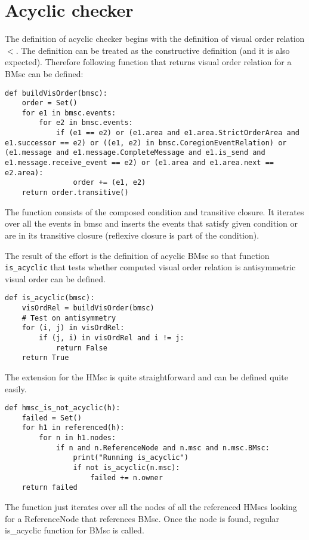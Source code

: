 \documentclass[11pt,oneside]{fithesis2}
\newcommand{\T}[1]{\texttt{#1}}
\begin{document}
\section{Acyclic checker}
The definition of acyclic checker begins with the definition of visual order relation $<$. The definition can be treated as the constructive definition (and it is also expected). Therefore following function that returns visual order relation for a BMsc can be defined:
\begin{lstlisting}
def buildVisOrder(bmsc):
    order = Set()
    for e1 in bmsc.events:
        for e2 in bmsc.events:
            if (e1 == e2) or (e1.area and e1.area.StrictOrderArea and e1.successor == e2) or ((e1, e2) in bmsc.CoregionEventRelation) or (e1.message and e1.message.CompleteMessage and e1.is_send and e1.message.receive_event == e2) or (e1.area and e1.area.next == e2.area):
                order += (e1, e2)
    return order.transitive()
\end{lstlisting}
The function consists of the composed condition and transitive closure. It iterates over all the events in bmsc and inserts the events that satisfy given condition or are in its transitive closure (reflexive closure is part of the condition).

The result of the effort is the definition of acyclic BMsc so that function \T{is\_acyclic} that tests whether computed visual order relation is antisymmetric visual order can be defined. 
\begin{lstlisting}
def is_acyclic(bmsc):
    visOrdRel = buildVisOrder(bmsc)
    # Test on antisymmetry
    for (i, j) in visOrdRel:
        if (j, i) in visOrdRel and i != j:
            return False
    return True
\end{lstlisting}

The extension for the HMsc is quite straightforward and can be defined quite easily.
\begin{lstlisting}
def hmsc_is_not_acyclic(h):
    failed = Set()
    for h1 in referenced(h):
        for n in h1.nodes:
            if n and n.ReferenceNode and n.msc and n.msc.BMsc:
                print("Running is_acyclic")
                if not is_acyclic(n.msc):
                    failed += n.owner
    return failed
\end{lstlisting}

The function just iterates over all the nodes of all the referenced HMscs looking for a ReferenceNode that references BMsc. Once the node is found, regular is\_acyclic function for BMsc is called.
\end{document}
